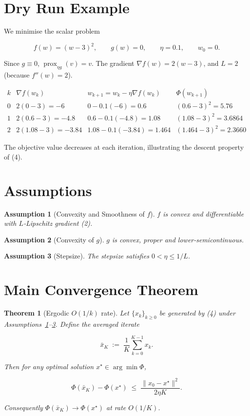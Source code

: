 \documentclass{article}
\newtheorem{theorem}{Theorem}
\newtheorem{assumption}{Assumption}
\newcommand{\prox}{\operatorname{prox}}
\begin{document}
\section*{Dry Run Example}
We minimise the scalar problem  

\[
f(w)=(w-3)^{2},\qquad g(w)=0,\qquad \eta=0.1,\qquad w_{0}=0 .
\]

Since $g\equiv0$, $\prox_{\eta g}(v)=v$.  
The gradient $\nabla f(w)=2(w-3)$, and $L=2$ (because $f''(w)=2$).  

\[
\begin{array}{c|c|c|c}
k & \nabla f(w_{k}) & w_{k+1}=w_{k}-\eta\nabla f(w_{k}) & \Phi(w_{k+1})\\ \hline
0 & 2(0-3)=-6 & 0-0.1(-6)=0.6 & (0.6-3)^{2}=5.76\\
1 & 2(0.6-3)=-4.8 & 0.6-0.1(-4.8)=1.08 & (1.08-3)^{2}=3.6864\\
2 & 2(1.08-3)=-3.84 & 1.08-0.1(-3.84)=1.464 & (1.464-3)^{2}=2.3660
\end{array}
\]

The objective value decreases at each iteration, illustrating the descent property of (4).

\newpage
\section*{Assumptions}
\begin{assumption}[Convexity and Smoothness of $f$]
\label{ass:f}
$f$ is convex and differentiable with $L$‑Lipschitz gradient (2).
\end{assumption}
\begin{assumption}[Convexity of $g$]
\label{ass:g}
$g$ is convex, proper and lower‑semicontinuous.
\end{assumption}
\begin{assumption}[Stepsize]
\label{ass:eta}
The stepsize satisfies $0<\eta\le 1/L$.
\end{assumption}

\section*{Main Convergence Theorem}
\begin{theorem}[Ergodic $O(1/k)$ rate]\label{thm:ergodic}
Let $\{x_{k}\}_{k\ge0}$ be generated by (4) under Assumptions~\ref{ass:f}–\ref{ass:eta}.  
Define the averaged iterate  

\[
\bar{x}_{K}\;:=\;\frac{1}{K}\sum_{k=0}^{K-1}x_{k}.
\]

Then for any optimal solution $x^{\star}\in\arg\min\Phi$,

\[
\Phi(\bar{x}_{K})-\Phi(x^{\star})
\;\le\;
\frac{\|x_{0}-x^{\star}\|^{2}}{2\eta K}.
\tag{5}
\]

Consequently $\Phi(\bar{x}_{K})\to\Phi(x^{\star})$ at rate $O(1/K)$.
\end{theorem}
\end{document}
